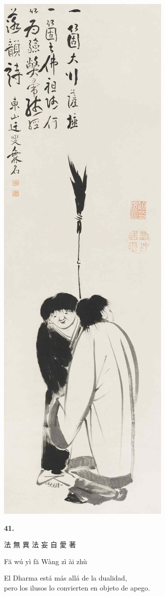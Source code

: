 \documentclass[
  a5paperpaper,
]{article}
\begin{document}
\hypertarget{01}{}
\includegraphics{../img/image09.jpg}

\begin{verseblock}

\newpage

\begin{center}\textbf{41.}\end{center}

法 無 異 法 妄 自 愛 著

Fă wú yì fă Wàng zì ài zhù

El Dharma está más allá de la dualidad,\\
pero los ilusos lo convierten en objeto de apego.

\end{verseblock}
\end{document}
